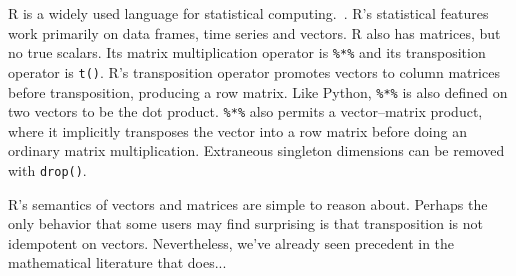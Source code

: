 R is a widely used language for statistical computing.~\cite{Rlang}.
R's statistical features work primarily on data frames, time series and vectors.
R also has matrices, but no true scalars.
Its matrix multiplication operator is \verb|%*%| and its transposition operator
is \verb|t()|.
R's transposition operator promotes vectors to column matrices before
transposition, producing a row matrix.
Like Python, \verb|%*%| is also defined on two vectors to be the dot product.
\verb|%*%| also permits a vector--matrix product, where it implicitly
transposes the vector into a row matrix before doing an ordinary matrix
multiplication.
Extraneous singleton dimensions can be removed with \verb|drop()|.

R's semantics of vectors and matrices are simple to reason about.
Perhaps the only behavior that some users may find surprising is that
transposition is not idempotent on vectors.
Nevertheless, we've already seen precedent in the mathematical literature
that does...
